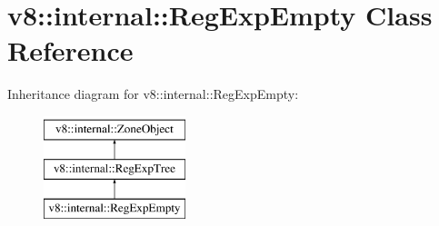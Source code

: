 \hypertarget{classv8_1_1internal_1_1RegExpEmpty}{}\section{v8\+:\+:internal\+:\+:Reg\+Exp\+Empty Class Reference}
\label{classv8_1_1internal_1_1RegExpEmpty}
Inheritance diagram for v8\+:\+:internal\+:\+:Reg\+Exp\+Empty\+:\begin{figure}[H]
\begin{center}
\leavevmode
\includegraphics[height=3.000000cm]{classv8_1_1internal_1_1RegExpEmpty}
\end{center}
\end{figure}
